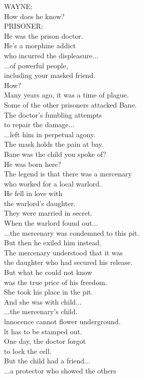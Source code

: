 \documentclass{article}
\begin{document}
\begin{multicols}{3}
WAYNE:\\
How does he know?\\
PRISONER:\\
He was the prison doctor.\\
He's a morphine addict\\
who incurred the displeasure...\\
...of powerful people,\\
including your masked friend.\\
How?\\
Many years ago, it was a time of plague.\\
Some of the other prisoners attacked Bane.\\
The doctor's fumbling attempts\\
to repair the damage...\\
...left him in perpetual agony.\\
The mask holds the pain at bay.\\
Bane was the child you spoke of?\\
He was born here?\\
The legend is that there was a mercenary\\
who worked for a local warlord.\\
He fell in love with\\
the warlord's daughter.\\
They were married in secret.\\
When the warlord found out...\\
...the mercenary was condemned to this pit.\\
But then he exiled him instead.\\
The mercenary understood that it was\\
the daughter who had secured his release.\\
But what he could not know\\
was the true price of his freedom.\\
She took his place in the pit.\\
And she was with child...\\
...the mercenary's child.\\
lnnocence cannot flower underground.\\
lt has to be stamped out.\\
One day, the doctor forgot\\
to lock the cell.\\
But the child had a friend...\\
...a protector who showed the others\\

\end{multicols}
\end{document}
